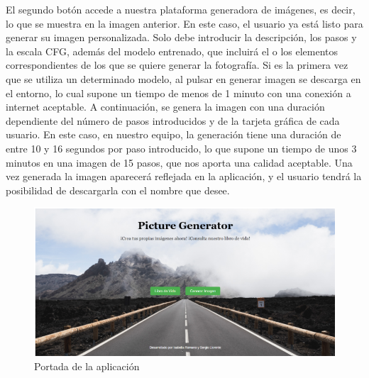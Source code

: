 El segundo botón accede a nuestra plataforma generadora de imágenes, es decir, lo que se muestra en la imagen anterior. En este caso, el usuario ya está listo para generar su imagen personalizada. Solo debe introducir la descripción, los pasos y la escala CFG, además del modelo entrenado, que incluirá el o los elementos correspondientes de los que se quiere generar la fotografía. Si es la primera vez que se utiliza un determinado modelo, al pulsar en generar imagen se descarga en el entorno, lo cual supone un tiempo de menos de 1 minuto con una conexión a internet aceptable. A continuación, se genera la imagen con una duración dependiente del número de pasos introducidos y de la tarjeta gráfica de cada usuario. En este caso, en nuestro equipo, la generación tiene una duración de entre 10 y 16 segundos por paso introducido, lo que supone un tiempo de unos 3 minutos en una imagen de 15 pasos, que nos aporta una calidad aceptable. Una vez generada la imagen aparecerá reflejada en la aplicación, y el usuario tendrá la posibilidad de descargarla con el nombre que desee.\\

\begin{figure}[!htb]
	\centering
	\includegraphics[width = 0.9
	\textwidth]{Imagenes/Vectorial/portadapp.png}
	\caption{Portada de la aplicación}
	\label{fig:portadaapp}
\end{figure}
